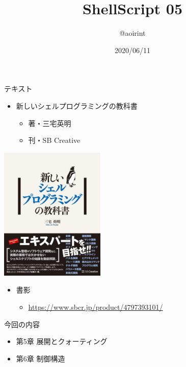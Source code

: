 \documentclass[12pt,aspectratio=169]{beamer}
\title{ShellScript 05}
\author{@aoirint}
\date{2020/06/11}
\begin{document}
\frame{\maketitle}

\begin{frame}{テキスト}

  \begin{minipage}{0.58\textwidth}
    \begin{itemize}
      \item 新しいシェルプログラミングの教科書
      \begin{itemize}
        \item 著・三宅英明
        \item 刊・SB Creative
      \end{itemize}
    \end{itemize}
  \end{minipage}
  \hfill
  \begin{minipage}{0.38\textwidth}
    \vspace{-4\baselineskip}
    \begin{center}
      \includegraphics[width=5cm,bb=0 0 467 596]{../01/images/shellbook.jpg}
    \end{center}
  \end{minipage}

  \begin{itemize}
    \item 書影
    \begin{itemize}
      \item { \small \url{https://www.sbcr.jp/product/4797393101/} }
    \end{itemize}
  \end{itemize}

\end{frame}


\begin{frame}{今回の内容}

  \begin{itemize}
    \item 第5章 展開とクォーティング
    \item 第6章 制御構造
  \end{itemize}

\end{frame}
\end{document}
